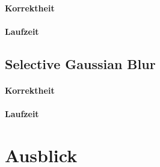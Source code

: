 \documentclass[10pt,a4paper,draft]{article}
\begin{document}
\paragraph{Korrektheit}
\paragraph{Laufzeit}
\subsection{Selective Gaussian Blur}
\paragraph{Korrektheit}
\paragraph{Laufzeit}
\section{Ausblick}
\end{document}
